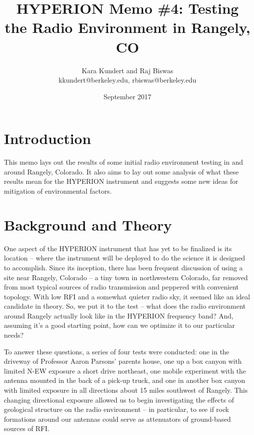 \documentclass[11pt]{article}
\makeatletter
\newcommand{\thetitle}{HYPERION Memo \#4: Testing the Radio Environment in 
Rangely, CO}
\newcommand{\theauthor}{Kara Kundert and Raj Biswas}
\newcommand{\theauthorsemail}{kkundert@berkeley.edu, rbiswas@berkeley.edu}
\newcommand{\thedate}{September 2017}
\makeatother
\begin{document}
\title{
    \sffamily\bfseries\huge
    \thetitle \\
}
\author{
    \sffamily\theauthor \\
    \sffamily\theauthorsemail
}
\date{\thedate}
\maketitle
\sloppy

\section{Introduction}

This memo lays out the results of some initial radio environment testing in and 
around Rangely, Colorado. It also aims to lay out some analysis of what these 
results mean for the HYPERION instrument and suggests some new ideas for 
mitigation of environmental factors.

\section{Background and Theory}

One aspect of the HYPERION instrument that has yet to be finalized is its 
location -- where the instrument will be deployed to do the science it is 
designed to accomplish. Since its inception, there has been frequent discussion 
of using a site near Rangely, Colorado -- a tiny town in northwestern Colorado, 
far removed from most typical sources of radio transmission and peppered with 
convenient topology. With low RFI and a somewhat quieter radio sky, it seemed 
like an ideal candidate in theory. So, we put it to the test -- what does the 
radio environment around Rangely actually look like in the HYPERION frequency 
band?  And, assuming it's a good starting point, how can we optimize it to our 
particular needs?

To answer these questions, a series of four tests were conducted: one in the 
driveway of Professor Aaron Parsons' parents house, one up a box canyon with 
limited N-EW exposure a short drive northeast, one mobile experiment with the 
antenna mounted in the back of a pick-up truck, and one in another box canyon 
with limited exposure in all directions about 15 miles southwest of Rangely.  
This changing directional exposure allowed us to begin investigating the 
effects of geological structure on the radio environment -- in particular, to 
see if rock formations around our antennas could serve as attenuators of 
ground-based sources of RFI. 
\end{document}
